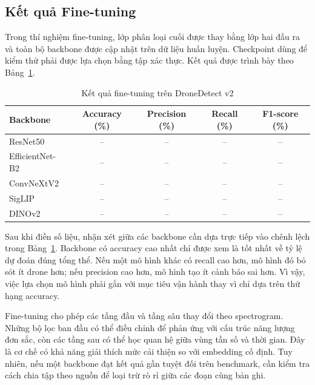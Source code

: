 \documentclass[../DoAn.tex]{subfiles}
\begin{document}
\subsection{Kết quả Fine-tuning}

Trong thí nghiệm fine-tuning, lớp phân loại cuối được thay bằng lớp hai đầu ra và toàn bộ backbone được cập nhật trên dữ liệu huấn luyện. Checkpoint dùng để kiểm thử phải được lựa chọn bằng tập xác thực. Kết quả được trình bày theo Bảng~\ref{tab:finetune_benchmark}.

\begin{table}[H]
    \centering
    \caption{Kết quả fine-tuning trên DroneDetect v2}
    \label{tab:finetune_benchmark}
    \renewcommand{\arraystretch}{1.3}
    \begin{tabular}{|p{}|c|c|c|c|}
        \hline
        \textbf{Backbone} & \textbf{Accuracy (\%)} & \textbf{Precision (\%)} & \textbf{Recall (\%)} & \textbf{F1-score (\%)} \\ \hline
        ResNet50 & -- & -- & -- & -- \\ \hline
        EfficientNet-B2 & -- & -- & -- & -- \\ \hline
        ConvNeXtV2 & -- & -- & -- & -- \\ \hline
        SigLIP & -- & -- & -- & -- \\ \hline
        DINOv2 & -- & -- & -- & -- \\ \hline
    \end{tabular}
\end{table}

Sau khi điền số liệu, nhận xét giữa các backbone cần dựa trực tiếp vào chênh lệch trong Bảng~\ref{tab:finetune_benchmark}. Backbone có accuracy cao nhất chỉ được xem là tốt nhất về tỷ lệ dự đoán đúng tổng thể. Nếu một mô hình khác có recall cao hơn, mô hình đó bỏ sót ít drone hơn; nếu precision cao hơn, mô hình tạo ít cảnh báo sai hơn. Vì vậy, việc lựa chọn mô hình phải gắn với mục tiêu vận hành thay vì chỉ dựa trên thứ hạng accuracy.

Fine-tuning cho phép các tầng đầu và tầng sâu thay đổi theo spectrogram. Những bộ lọc ban đầu có thể điều chỉnh để phản ứng với cấu trúc năng lượng đơn sắc, còn các tầng sau có thể học quan hệ giữa vùng tần số và thời gian. Đây là cơ chế có khả năng giải thích mức cải thiện so với embedding cố định. Tuy nhiên, nếu một backbone đạt kết quả gần tuyệt đối trên benchmark, cần kiểm tra cách chia tập theo nguồn để loại trừ rò rỉ giữa các đoạn cùng bản ghi.

\end{document}
